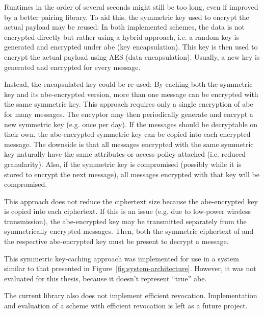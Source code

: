 Runtimes in the order of several seconds might still be too long, even if improved by a better pairing library.
To aid this, the symmetric key used to encrypt the actual payload may be reused:
In both implemented schemes, the data is not encrypted directly but rather using a hybrid approach, i.e. a random key is generated and encrypted under \acrshort{abe} (key encapsulation).
This key is then used to encrypt the actual payload using AES (data encapsulation).
Usually, a new key is generated and encrypted for every message.

Instead, the encapsulated key could be re-used:
By caching both the symmetric key and its \acrshort{abe}-encrypted version, more than one message can be encrypted with the same symmetric key.
This approach requires only a single encryption of \acrshort{abe} for many messages.
The encyptor may then periodically generate and encrypt a new symmetric key (e.g. once per day).
If the messages should be decryptable on their own, the \acrshort{abe}-encrypted symmetric key can be copied into each encrypted message.
The downside is that all messages encrypted with the same symmetric key naturally have the same attributes or access policy attached (i.e. reduced granularity).
Also, if the symmetric key is compromised (possibly while it is stored to encrypt the next message), all messages encrypted with that key will be compromised.

This approach does not reduce the ciphertext size because the \acrshort{abe}-encrypted key is copied into each ciphertext.
If this is an issue (e.g. due to low-power wireless transmission), the \acrshort{abe}-encrypted key may be transmitted separately from the symmetrically encrypted messages.
Then, both the symmetric ciphertext of and the respective \acrshort{abe}-encrypted key must be present to decrypt a message.

This symmetric key-caching approach was implemented for use in a system similar to that presented in Figure~\ref{fig:system-architecture}.
However, it was not evaluated for this thesis, because it doesn't represent ``true'' \acrlong{abe}.

The current library also does not implement efficient revocation. 
Implementation and evaluation of a scheme with efficient revocation is left as a future project.
